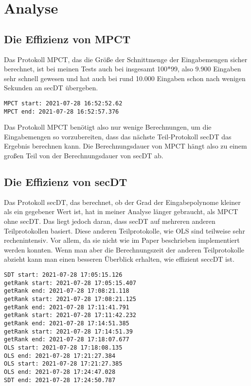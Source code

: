 \chapter{Analyse}


\section{Die Effizienz von MPCT}
Das Protokoll MPCT, das die Größe der Schnittmenge der Eingabemengen sicher berechnet, ist bei meinen Tests auch bei insgesamt 100*99, also 9.900 Eingaben sehr schnell gewesen und hat auch bei rund 10.000 Eingaben schon nach wenigen Sekunden an secDT übergeben.\\
\begin{lstlisting}[caption = Ausschnitt von Rückgabe von Test MPCTTestBig. Dauer von MPCT ohne SDT]
MPCT start: 2021-07-28 16:52:52.62
MPCT end: 2021-07-28 16:52:57.376
\end{lstlisting}
Das Protokoll MPCT benötigt also nur wenige Berechnungen, um die Eingabemengen so vorzubereiten, dass das nächste Teil-Protokoll secDT das Ergebnis berechnen kann. Die Berechnungsdauer von MPCT hängt also zu einem großen Teil von der Berechnungsdauer von secDT ab. 

\section{Die Effizienz von secDT}
Das Protokoll secDT, das berechnet, ob der Grad der Eingabepolynome kleiner als ein gegebener Wert ist, hat in meiner Analyse länger gebraucht, als MPCT ohne secDT. Das liegt jedoch daran, dass secDT auf mehreren anderen Teilprotokollen basiert. Diese anderen Teilprotokolle, wie OLS sind teilweise sehr rechenintensiv. Vor allem, da sie nicht wie im Paper beschrieben implementiert werden konnten. Wenn man aber die Berechnungszeit der anderen Teilprotokolle abzieht kann man einen besseren Überblick erhalten, wie effizient seccDT ist.

\begin{lstlisting}[caption = Ausschnitt von Rückgabe von Test MPCTTestBig. Dauer von SDT]
SDT start: 2021-07-28 17:05:15.126
getRank start: 2021-07-28 17:05:15.407
getRank end: 2021-07-28 17:08:21.118
getRank start: 2021-07-28 17:08:21.125
getRank end: 2021-07-28 17:11:41.791
getRank start: 2021-07-28 17:11:42.232
getRank end: 2021-07-28 17:14:51.385
getRank start: 2021-07-28 17:14:51.39
getRank end: 2021-07-28 17:18:07.677
OLS start: 2021-07-28 17:18:08.135
OLS end: 2021-07-28 17:21:27.384
OLS start: 2021-07-28 17:21:27.385
OLS end: 2021-07-28 17:24:47.028
SDT end: 2021-07-28 17:24:50.787
\end{lstlisting}

